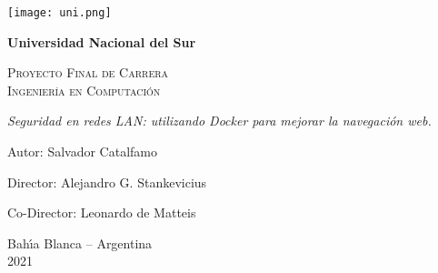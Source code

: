 \begin{titlepage}

\begin{center}
\texttt{[image: uni.png]}
\end{center}

\begin{center}

\textbf{\LARGE Universidad Nacional del Sur}\\

\vspace{2cm}

\textsc{\LARGE Proyecto Final de Carrera}\\ \vspace{.1cm}
\textsc{\LARGE Ingenier\'ia en Computaci\'on}\\


\vspace{4cm}

\emph{\LARGE Seguridad en redes LAN: utilizando Docker para mejorar la navegación web.}\\

\vspace{2.5cm}
\end{center}
{\Large}

{\Large Autor: Salvador Catalfamo}

{\Large Director: Alejandro G. Stankevicius}

{\Large Co-Director: Leonardo de Matteis}
\begin{center}
\vspace{2.5cm}

{\sc\Large Bah\'{\i}a Blanca -- Argentina}\\
\vspace*{.1cm} {\Large 2021}

\end{center}
\end{titlepage}
